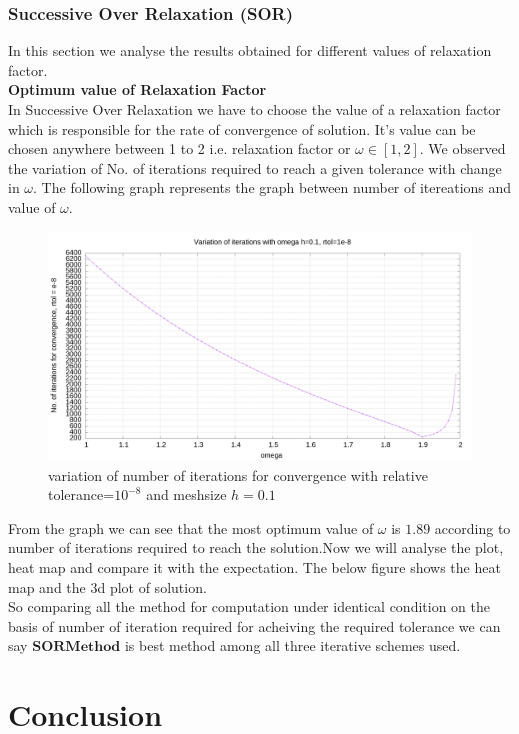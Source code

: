 \subsubsection{Successive Over Relaxation (SOR)}
In this section we analyse the results obtained for different values of relaxation factor.\\[2mm]
\noindent
\textbf{ Optimum value of Relaxation Factor } \\
In Successive Over Relaxation we have to choose the value of a relaxation factor which is responsible for the rate of convergence of solution. It's value can be chosen anywhere between 1 to 2 i.e. relaxation factor or $\omega  \in [1,2]$. We observed the variation of No. of iterations required to reach a given tolerance with change in $ \omega $. The following graph represents the graph between number of itereations and value of $\omega$. \\
\begin{figure}[h]
    \centering
    \includegraphics[width=\textwidth]{content/graphs/omega.png}
    \caption{variation of number of iterations for convergence with relative tolerance=$10^{-8}$ and meshsize $h = 0.1$  }
    \label{omega variation}
\end{figure}
From the graph we can see that the most optimum value of $ \omega $ is $1.89$ according to number of iterations required to reach the solution.Now we will analyse the plot, heat map and  compare it with the expectation. The below figure shows the heat map and the 3d plot of solution. \\

So comparing all the method for computation under identical condition on the basis of number of iteration required for acheiving the required tolerance we can say $ \boldsymbol{SOR Method} $ is best method among all three iterative schemes used.
\newpage
\section{Conclusion}
